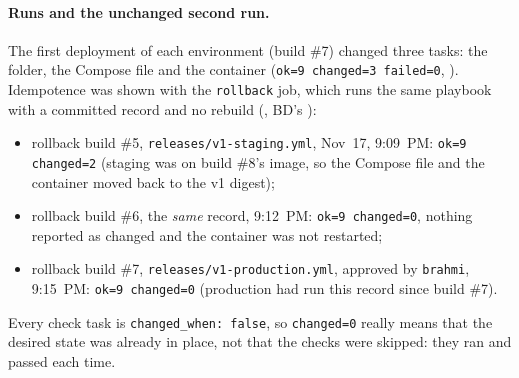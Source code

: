 \paragraph{Runs and the unchanged second run.} The first deployment of each environment (build \#7) changed three tasks: the folder, the Compose file and the container (\texttt{ok=9 changed=3 failed=0}, ). Idempotence was shown with the \texttt{rollback} job,
which runs the same playbook with a committed record and no rebuild (, BD's ):
\begin{itemize}
\item rollback build \#5, \texttt{releases/v1-staging.yml}, Nov~17, 9:09~PM: \texttt{ok=9 changed=2} (staging was on build \#8's image, so the Compose file and the container moved back to the v1 digest);
\item rollback build \#6, the \emph{same} record, 9:12~PM: \texttt{ok=9 changed=0}, nothing reported as changed and the container was not restarted;
\item rollback build \#7, \texttt{releases/v1-production.yml}, approved by \texttt{brahmi}, 9:15~PM: \texttt{ok=9 changed=0} (production had run this record since build \#7).
\end{itemize}
Every check task is \texttt{changed\_when: false}, so \texttt{changed=0} really means that the desired state was already in place, not that the checks were skipped: they ran and passed each time.

\begin{longlisting}
\inputminted[fontsize=\scriptsize]{yaml}{config/twintrack/ansible/deploy.yml}
\caption{\texttt{ansible/deploy.yml}: the playbook for every release, restore and rollback (course starter, unchanged).}
\label{Listing:EDeliveryPlaybook}
\end{longlisting}

\begin{longlisting}
\inputminted[fontsize=\scriptsize]{yaml}{config/twintrack/ansible/templates/compose.yaml.j2}
\caption{\texttt{ansible/templates/compose.yaml.j2}: the course template plus a 128~MiB memory limit.}
\label{Listing:EDeliveryTemplate}
\end{longlisting}

\begin{longlisting}
\inputminted[fontsize=\scriptsize]{ini}{config/twintrack/ansible/inventory.ini}
\caption{\texttt{ansible/inventory.ini}: no secret; the key is a Jenkins credential and the host key is pinned in \texttt{ansible/known\_hosts}.}
\label{Listing:EDeliveryInventory}
\end{longlisting}

